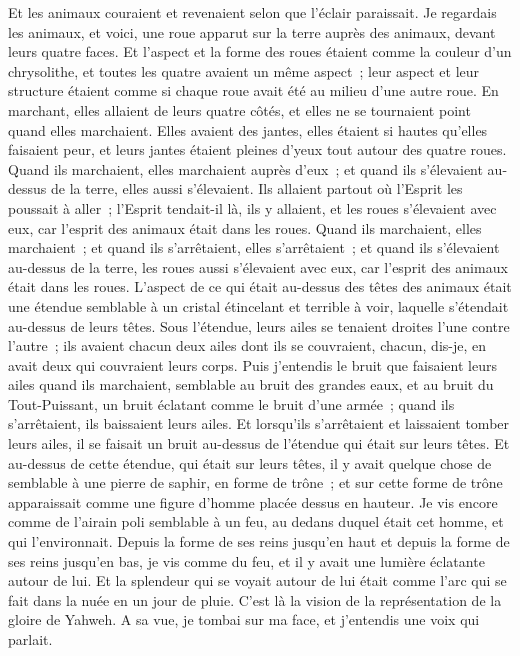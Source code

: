 \begin{multicols}{2}
Et les animaux couraient et revenaient selon que l'éclair paraissait.
Je regardais les animaux, et voici, une roue apparut sur la terre auprès des animaux, devant leurs quatre faces.
Et l'aspect et la forme des roues étaient comme la couleur d'un chrysolithe, et toutes les quatre avaient un même aspect~; leur aspect et leur structure étaient comme si chaque roue avait été au milieu d'une autre roue.
En marchant, elles allaient de leurs quatre côtés, et elles ne se tournaient point quand elles marchaient.
Elles avaient des jantes, elles étaient si hautes qu'elles faisaient peur, et leurs jantes étaient pleines d'yeux tout autour des quatre roues.
Quand ils marchaient, elles marchaient auprès d'eux~; et quand ils s'élevaient au-dessus de la terre, elles aussi s'élevaient.
Ils allaient partout où l'Esprit les poussait à aller~; l'Esprit tendait-il là, ils y allaient, et les roues s'élevaient avec eux, car l'esprit des animaux était dans les roues.
Quand ils marchaient, elles marchaient~; et quand ils s'arrêtaient, elles s'arrêtaient~; et quand ils s'élevaient au-dessus de la terre, les roues aussi s'élevaient avec eux, car l'esprit des animaux était dans les roues.
L'aspect de ce qui était au-dessus des têtes des animaux était une étendue semblable à un cristal étincelant et terrible à voir, laquelle s'étendait au-dessus de leurs têtes.
Sous l'étendue, leurs ailes se tenaient droites l'une contre l'autre~; ils avaient chacun deux ailes dont ils se couvraient, chacun, dis-je, en avait deux qui couvraient leurs corps.
Puis j'entendis le bruit que faisaient leurs ailes quand ils marchaient, semblable au bruit des grandes eaux, et au bruit du Tout-Puissant, un bruit éclatant comme le bruit d'une armée~; quand ils s'arrêtaient, ils baissaient leurs ailes.
Et lorsqu'ils s'arrêtaient et laissaient tomber leurs ailes, il se faisait un bruit au-dessus de l'étendue qui était sur leurs têtes.
Et au-dessus de cette étendue, qui était sur leurs têtes, il y avait quelque chose de semblable à une pierre de saphir, en forme de trône~; et sur cette forme de trône apparaissait comme une figure d'homme placée dessus en hauteur.
Je vis encore comme de l'airain poli semblable à un feu, au dedans duquel était cet homme, et qui l'environnait. Depuis la forme de ses reins jusqu'en haut et depuis la forme de ses reins jusqu'en bas, je vis comme du feu, et il y avait une lumière éclatante autour de lui.
Et la splendeur qui se voyait autour de lui était comme l'arc qui se fait dans la nuée en un jour de pluie. C'est là la vision de la représentation de la gloire de Yahweh. A sa vue, je tombai sur ma face, et j'entendis une voix qui parlait.

\end{multicols}
